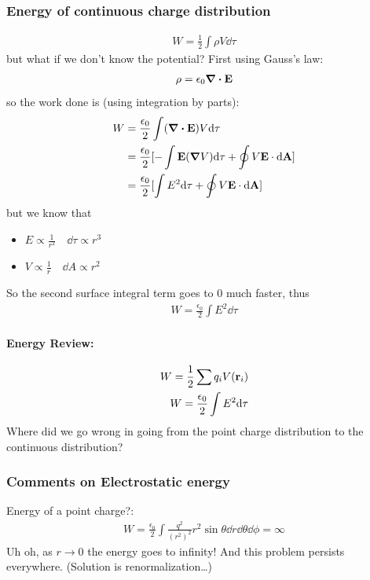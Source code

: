 \documentclass[../main.tex]{subfiles}
\begin{document}
\subsubsection{Energy of continuous charge distribution}
\begin{align*}
    W = \frac{1}{2} \int \rho V \dd \tau
\end{align*}
but what if we don't know the potential? First using Gauss's law:
\begin{align*}
    \rho = \epsilon_0 \div \vb E
\end{align*}
so the work done is (using integration by parts):
\begin{align*}
    W &= \frac{\epsilon_0}{2} \int (\div \vb E) V \dd\tau \\
    &= \frac{\epsilon_0}{2} [-\int \vb E(\grad V) \dd\tau + \oint V\vb E \cdot \dd \vb A] \\
    &= \frac{\epsilon_0}{2} [\int E^2 \dd \tau + \oint V \vb E \cdot \dd \vb A]
\end{align*}
but we know that
\begin{itemize}
    \item $E \propto \frac{1}{r^2} \quad \dd\tau \propto r^3$
    \item $V \propto \frac{1}{r} \quad \dd A \propto r^2$
\end{itemize}
So the second surface integral term goes to 0 much faster, thus
\begin{align*}
    W = \frac{\epsilon_0}{2} \int E^2 \dd \tau
\end{align*}

\newpage
{}

\paragraph*{Energy Review:}
\begin{align*}
    W = \frac{1}{2} \sum q_i V(\vb r_i) \\
    W = \frac{\epsilon_0}{2} \int E^2 \dd \tau
\end{align*}
Where did we go wrong in going from the point charge distribution to the continuous distribution?

\subsubsection{Comments on Electrostatic energy}

Energy of a point charge?:
\begin{align*}
    W = \frac{\epsilon_0}{2} \int \frac{q^2}{(r^2)^2} r^2 \sin\theta \dd r \dd\theta \dd\phi = \infty
\end{align*}
Uh oh, as $r \to 0$ the energy goes to infinity! And this problem persists everywhere. (Solution is renormalization\dots)
\end{document}
